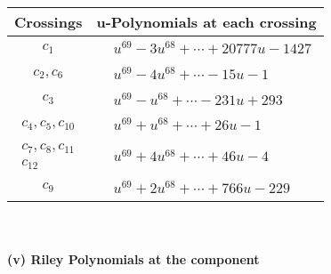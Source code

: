 \documentclass[1p]{elsarticle_modified}
\theoremstyle{definition}
\begin{document}
\begin{tabular}{m{50pt}|m{274pt}}
Crossings & \hspace{64pt}u-Polynomials at each crossing \\
\hline $$\begin{aligned}c_{1}\end{aligned}$$&$\begin{aligned}
&u^{69}-3 u^{68}+\cdots+20777 u-1427
\end{aligned}$\\
\hline $$\begin{aligned}c_{2},c_{6}\end{aligned}$$&$\begin{aligned}
&u^{69}-4 u^{68}+\cdots-15 u-1
\end{aligned}$\\
\hline $$\begin{aligned}c_{3}\end{aligned}$$&$\begin{aligned}
&u^{69}- u^{68}+\cdots-231 u+293
\end{aligned}$\\
\hline $$\begin{aligned}c_{4},c_{5},c_{10}\end{aligned}$$&$\begin{aligned}
&u^{69}+u^{68}+\cdots+26 u-1
\end{aligned}$\\
\hline $$\begin{aligned}c_{7},c_{8},c_{11}\\c_{12}\end{aligned}$$&$\begin{aligned}
&u^{69}+4 u^{68}+\cdots+46 u-4
\end{aligned}$\\
\hline $$\begin{aligned}c_{9}\end{aligned}$$&$\begin{aligned}
&u^{69}+2 u^{68}+\cdots+766 u-229
\end{aligned}$\\
\hline
\end{tabular}\\~\\
\newpage\renewcommand{\arraystretch}{1}
\flushleft \textbf{(v) Riley Polynomials at the component}\newline \\
\end{document}
